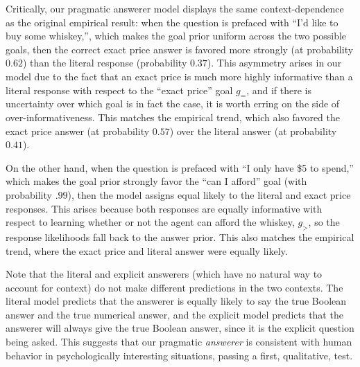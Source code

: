 \documentclass[12pt, floatsintext, jou]{apa6}
\begin{document}
Critically, our pragmatic answerer model displays the same context-dependence as the original empirical result: when the question is prefaced with ``I'd like to buy some whiskey,'', which makes the goal prior uniform across the two possible goals, then the correct exact price answer is favored more strongly (at probability $0.62$) than the literal response (probability $0.37$). This asymmetry arises in our model due to the fact that an exact price is much more highly informative than a literal response with respect to the ``exact price'' goal $g_=$, and if there is uncertainty over which goal is in fact the case, it is worth erring on the side of over-informativeness. This matches the empirical trend, which also favored the exact price answer (at probability $0.57$) over the literal answer (at probability $0.41$).

On the other hand, when the question is prefaced with ``I only have \$5 to spend,'' which makes the goal prior strongly favor the ``can I afford'' goal (with probability $.99$), then the model assigns equal likely to the literal and exact price responses. This arises because both responses are equally informative with respect to learning whether or not the agent can afford the whiskey, $g_>$, so the response likelihoods fall back to the answer prior. This also matches the empirical trend, where the exact price and literal answer were equally likely.

Note that the literal and explicit answerers (which have no natural way to account for context) do not make different predictions in the two contexts. The literal model predicts that the answerer is equally likely to say the true Boolean answer and the true numerical answer, and the explicit model predicts that the answerer will always give the true Boolean answer, since it is the explicit question being asked. This suggests that our pragmatic \emph{answerer} is consistent with human behavior in psychologically interesting situations, passing a first, qualitative, test. 
\end{document}
